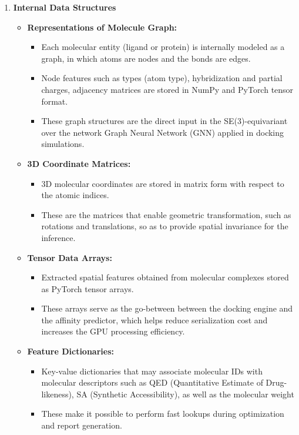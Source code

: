 \documentclass[12pt,a4]{report}
\begin{document}
\vspace{0.4cm}
\begin{enumerate}[label=\textbf{\Alph*.}, leftmargin=1.2cm]
    
    \item \textbf{Internal Data Structures}
    \begin{itemize}
        \item \textbf{Representations of Molecule Graph:}
        \begin{itemize}
            \item Each molecular entity (ligand or protein) is internally modeled as a graph, in which atoms are nodes and the bonds are edges.
            \item Node features such as types (atom type), hybridization and partial charges, adjacency matrices are stored in NumPy and PyTorch tensor format.
            \item These graph structures are the direct input in the SE(3)-equivariant over the network Graph Neural Network (GNN) applied in docking simulations.
        \end{itemize}

        \item \textbf{3D Coordinate Matrices:}
        \begin{itemize}
            \item 3D molecular coordinates are stored in matrix form with respect to the atomic indices.
            \item These are the matrices that enable geometric transformation, such as rotations and translations, so as to provide spatial invariance for the inference.
        \end{itemize}

        \item \textbf{Tensor Data Arrays:}
        \begin{itemize}
            \item Extracted spatial features obtained from molecular complexes stored as PyTorch tensor arrays.
            \item These arrays serve as the go-between between the docking engine and the affinity predictor, which helps reduce serialization cost and increases the GPU processing efficiency.
        \end{itemize}

        \item \textbf{Feature Dictionaries:}
        \begin{itemize}
            \item Key-value dictionaries that may associate molecular IDs with molecular descriptors such as QED (Quantitative Estimate of Drug-likeness), SA (Synthetic Accessibility), as well as the molecular weight
            \item These make it possible to perform fast lookups during optimization and report generation.
        \end{itemize}
    \end{itemize}


\end{enumerate}
\end{document}
